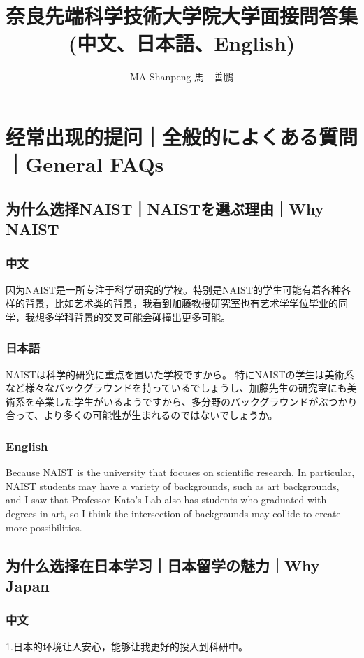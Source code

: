 \documentclass[lang=cn,11pt,a4paper]{elegantpaper}
\title{奈良先端科学技術大学院大学面接問答集\\(中文、日本語、English)}
\author{MA Shanpeng 馬　善鵬}
\institute{\href{https://inusturbo.github.io/}{個人ホームページ}}
\date{\zhtoday}
\begin{document}
\maketitle

\begin{abstract}


\end{abstract}

 \tableofcontents

\section{经常出现的提问｜全般的によくある質問｜General FAQs}
\subsection{为什么选择NAIST｜NAISTを選ぶ理由｜Why NAIST}
\subsubsection{中文}
因为NAIST是一所专注于科学研究的学校。特别是NAIST的学生可能有着各种各样的背景，比如艺术类的背景，我看到加藤教授研究室也有艺术学学位毕业的同学，我想多学科背景的交叉可能会碰撞出更多可能。
\subsubsection{日本語}
NAISTは科学的研究に重点を置いた学校ですから。 特にNAISTの学生は美術系など様々なバックグラウンドを持っているでしょうし、加藤先生の研究室にも美術系を卒業した学生がいるようですから、多分野のバックグラウンドがぶつかり合って、より多くの可能性が生まれるのではないでしょうか。
\subsubsection{English}
Because NAIST is the university that focuses on scientific research. In particular, NAIST students may have a variety of backgrounds, such as art backgrounds, and I saw that Professor Kato's Lab also has students who graduated with degrees in art, so I think the intersection of backgrounds may collide to create more possibilities.

\subsection{为什么选择在日本学习｜日本留学の魅力｜Why Japan}
\subsubsection{中文}
1.日本的环境让人安心，能够让我更好的投入到科研中。
\end{document}

